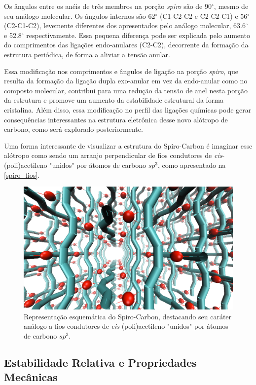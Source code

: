 	Os ângulos entre os anéis de três membros na porção \textit{spiro} são de 90$^\circ$, mesmo de seu análogo molecular. Os ângulos internos são 62$^\circ$ (C1-C2-C2 e C2-C2-C1) e 56$^\circ$ (C2-C1-C2), levemente diferentes dos apresentados pelo análogo molecular, 63.6$^\circ$ e 52.8$^\circ$ respectivamente. Essa pequena diferença pode ser explicada pelo aumento do comprimentos das ligações endo-anulares (C2-C2), decorrente da formação da estrutura periódica, de forma a aliviar a tensão anular. 
			
	Essa modificação nos comprimentos e ângulos de ligação na porção \textit{spiro}, que resulta da formação da ligação dupla exo-anular em vez da endo-anular como no composto molecular, contribui para uma redução da tensão de anel nesta porção da estrutura e promove um aumento da estabilidade estrutural da forma cristalina. Além disso, essa modificação no perfil das ligações químicas pode gerar consequências interessantes na estrutura eletrônica desse novo alótropo de carbono, como será explorado posteriormente.
	
	Uma forma interessante de visualizar a estrutura do Spiro-Carbon é imaginar esse alótropo como sendo um arranjo perpendicular de fios condutores de \textit{cis}-(poli)acetileno "unidos" por átomos de carbono $sp^3$, como apresentado na \autoref{spiro_fios}.
	
	\begin{figure}[ht]
		\centering
		\includegraphics[width=.7\linewidth]{capitulos/fig/results1/column5.png}
		\caption{Representação esquemática do Spiro-Carbon, destacando seu caráter análogo a fios condutores de \textit{cis}-(poli)acetileno "unidos" por átomos de carbono $sp^3$.}
		\label{spiro_fios}
	\end{figure}
	
	\subsection{Estabilidade Relativa e Propriedades Mecânicas}
	
